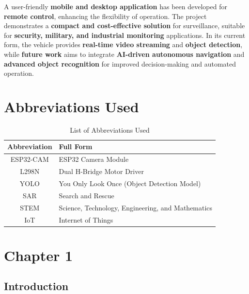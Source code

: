 \documentclass[12pt,a4paper]{report}
\begin{document}
A user-friendly \textbf{mobile and desktop application} has been developed for \textbf{remote control}, enhancing the flexibility of operation. The project demonstrates a \textbf{compact and cost-effective solution} for surveillance, suitable for \textbf{security, military, and industrial monitoring} applications. In its current form, the vehicle provides \textbf{real-time video streaming} and \textbf{object detection}, while \textbf{future work} aims to integrate \textbf{AI-driven autonomous navigation} and \textbf{advanced object recognition} for improved decision-making and automated operation.





\cleardoublepage



		\tableofcontents

			\chapter*{\centering Abbreviations Used }
		\label{Abbreviations Used}
\begin{table}[ht]
\centering
\begin{tabular}{|c|l|}
\hline
\textbf{Abbreviation} & \textbf{Full Form} \\ \hline
ESP32-CAM & ESP32 Camera Module \\ \hline
L298N & Dual H-Bridge Motor Driver \\ \hline
YOLO & You Only Look Once (Object Detection Model) \\ \hline
SAR & Search and Rescue \\ \hline
STEM & Science, Technology, Engineering, and Mathematics \\ \hline
IoT & Internet of Things \\ \hline
\end{tabular}
\caption{List of Abbreviations Used}
\label{tab:abbreviations}
\end{table}
	\renewcommand{\thesection}{\arabic{section}}
	\newpage
	{\vfill \chapter*{\centering \vfill Chapter 1 \vfill}\vfill}
	\thispagestyle{empty}
	\newpage

	\label{Introduction}
	\section{Introduction}
\end{document}
